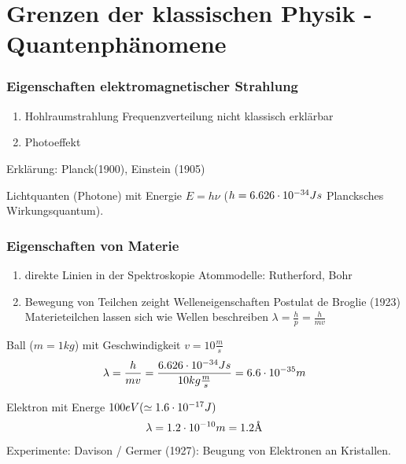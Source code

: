 \section{Grenzen der klassischen Physik - Quantenphänomene} %
\label{sec:Grenzen_der_klassischen_Physik_-_Quantenphänomene}
\subsubsection{Eigenschaften elektromagnetischer Strahlung} %
\label{ssub:Eigenschaften_elektromagnetischer_Strahlung}
\begin{enumerate}
    \item{Hohlraumstrahlung} 
        Frequenzverteilung nicht klassisch erklärbar
    \item{Photoeffekt}  
\end{enumerate}
Erklärung: Planck(1900), Einstein (1905)

Lichtquanten (Photone) mit Energie $E= h \nu$ ($h=6.626 \cdot 10^{-34} Js$
Plancksches Wirkungsquantum).
\subsubsection{Eigenschaften von Materie} %
\label{ssub:Eigenschaften_von_Materie}
\begin{enumerate}
    \item{direkte Linien in der Spektroskopie} 
        Atommodelle: Rutherford, Bohr
    \item{Bewegung von Teilchen zeight Welleneigenschaften} 
        Postulat de Broglie (1923)
        Materieteilchen lassen sich wie Wellen beschreiben 
        $\lambda = \frac{h}{p} = \frac{h}{mv}$
\end{enumerate}
\begin{bei}
    \item Ball ($m=1kg$) mit Geschwindigkeit $v = 10 \frac{m}{s}$
     \begin{equation*}
         \lambda = \frac{h}{mv} = \frac{6.626 \cdot 10^{-34}Js}{10 kg \frac{m}{s}} 
         = 6.6 \cdot 10^{-35} m
     \end{equation*}
    \item Elektron mit Energe $100eV (\simeq 1.6 \cdot 10^{-17}J)$
    \begin{equation*}
        \lambda = 1.2 \cdot 10^{-10}m = 1.2\mbox{\normalfont\AA}
    \end{equation*}
\end{bei}
Experimente: Davison / Germer (1927): Beugung von Elektronen an Kristallen.
